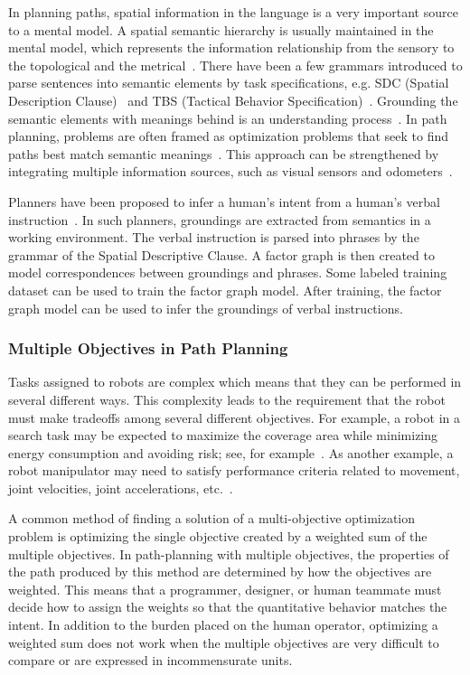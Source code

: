 \documentclass[phd]{byuprop}
\begin{document}
In planning paths, spatial information in the language is a very important source to a mental model.
A spatial semantic hierarchy is usually maintained in the mental model, which represents the information relationship from the sensory to the topological and the metrical~\cite{kuipers1999}.
There have been a few grammars introduced to parse sentences into semantic elements by task specifications, e.g. SDC (Spatial Description Clause)~\cite{tellex2011understanding} and TBS (Tactical Behavior Specification)~\cite{Boularias_2015_7953}.
Grounding the semantic elements with meanings behind is an understanding process~\cite{Kollar:2010:TUN:1734454.1734553}.
In path planning, problems are often framed as optimization problems that seek to find paths best match semantic meanings~\cite{tellex2011understanding,Boularias_2015_7953}.
This approach can be strengthened by integrating multiple information sources, such as visual sensors and odometers~\cite{6696569}.

Planners have been proposed to infer a human's intent from a human's verbal instruction~\cite{howard2014natural,Duvallet2014}.
In such planners, groundings are extracted from semantics in a working environment.
The verbal instruction is parsed into phrases by the grammar of the Spatial Descriptive Clause. 
A factor graph is then created to model correspondences between groundings and phrases.
Some labeled training dataset can be used to train the factor graph model.
After training, the factor graph model can be used to infer the groundings of verbal instructions.

\subsubsection{Multiple Objectives in Path Planning}
\label{sec:related_work:algorithm_specific_work:multiple_objectives_in_path_planning}

Tasks assigned to robots are complex which means that they can be performed in several different ways.
This complexity leads to the requirement that the robot must make tradeoffs among several different objectives.
For example, a robot in a search task may be expected to maximize the coverage area while minimizing energy consumption and avoiding risk; see, for example~\cite{Mei2005,Yi2014}. 
As another example, a robot manipulator may need to satisfy performance criteria related to movement, joint velocities, joint accelerations, etc.~\cite{Pires2004}.

A common method of finding a solution of a multi-objective optimization problem is optimizing the single objective created by a weighted sum of the multiple objectives.  
In path-planning with multiple objectives, the properties of the path produced by this method are determined by how the objectives are weighted. 
This means that a programmer, designer, or human teammate must decide how to assign the weights so that the quantitative behavior matches the intent.  
In addition to the burden placed on the human operator, optimizing a weighted sum does not work when the multiple objectives are very difficult to compare or are expressed in incommensurate units.
\end{document}

